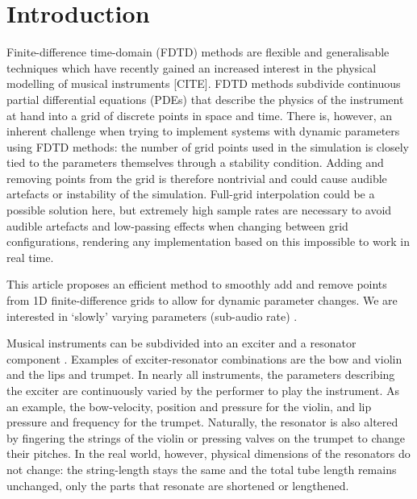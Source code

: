 \section{Introduction}

Finite-difference time-domain (FDTD) methods are flexible and generalisable techniques which have recently gained an increased interest in the physical modelling of musical instruments [CITE]. %
FDTD methods subdivide continuous partial differential equations (PDEs) that describe the physics of the instrument at hand into a grid of discrete points in space and time. 
There is, however, an inherent challenge when trying to implement systems with dynamic parameters using FDTD methods: the number of grid points used in the simulation is closely tied to the parameters themselves through a stability condition.
Adding and removing points from the grid is therefore nontrivial and could cause audible artefacts or instability of the simulation. Full-grid interpolation \cite[Ch. 5]{bilbao2009} could be a possible solution here, but extremely high sample rates are necessary to avoid audible artefacts and low-passing effects when changing between grid configurations, rendering any implementation based on this impossible to work in real time. 

This article proposes an efficient method to smoothly add and remove points from 1D finite-difference grids to allow for dynamic parameter changes. We are interested in `slowly' varying parameters (sub-audio rate) .

Musical instruments can be subdivided into an exciter and a resonator component \cite{Borin1989}.  Examples of exciter-resonator combinations are the bow and violin and the lips and trumpet. In nearly all instruments, the parameters describing the exciter are continuously varied by the performer to play the instrument. As an example, the bow-velocity, position and pressure for the violin, and lip pressure and frequency for the trumpet. Naturally, the resonator is also altered by fingering the strings of the violin or pressing valves on the trumpet to change their pitches. In the real world, however, physical dimensions of the resonators do not change: the string-length stays the same and the total tube length remains unchanged, only the parts that resonate are shortened or lengthened.

